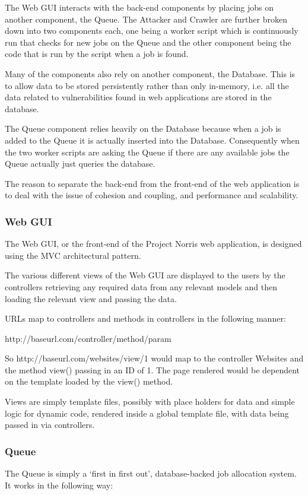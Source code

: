 \documentclass[12pt,a4paper]{article}
\begin{document}
The Web GUI interacts with the back-end components by placing jobs on another component, the Queue.
The Attacker and Crawler are further broken down into two components each, one being a worker script which is continuously run that checks for new jobs on the Queue and the other component being the code that is run by the script when a job is found.

Many of the components also rely on another component, the Database. This is to allow data to be stored persistently rather than only in-memory, i.e. all the data related to vulnerabilities found in web applications are stored in the database.

The Queue component relies heavily on the Database because when a job is added to the Queue it is actually inserted into the Database.  Consequently when the two worker scripts are asking the Queue if there are any available jobs the Queue actually just queries the database.

The reason to separate the back-end from the front-end of the web application is to deal with the issue of cohesion and coupling, and performance and scalability. 

\subsubsection{Web GUI}
The Web GUI, or the front-end of the Project Norris web application, is designed using the MVC architectural pattern.

The various different views of the Web GUI are displayed to the users by the controllers retrieving any required data from any relevant models and then loading the relevant view and passing the data.

URLs map to controllers and methods in controllers in the following manner:

http://baseurl.com/controller/method/param

So http://baseurl.com/websites/view/1 would map to the controller Websites and the method view() passing in an ID of 1.  The page rendered would be dependent on the template loaded by the view() method.

Views are simply template files, possibly with place holders for data and simple logic for dynamic code, rendered inside a global template file, with data being passed in via controllers.

\subsubsection{Queue}
The Queue is simply a `first in first out', database-backed job allocation system.  It works in the following way:
\end{document}
